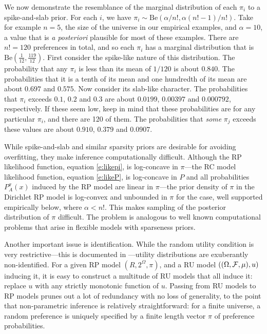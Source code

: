 \documentclass[11pt,letter]{article}
\newcommand{\Dpi}{Dirichlet RP model}
\begin{document}
We now demonstrate the resemblance of the marginal distribution of each $\pi_i$ to a spike-and-slab prior.
For each $i$, we have $\pi_i \sim \mathrm{Be}(\alpha/n!, \alpha (n!-1)/n!)$.
Take for example $n=5$, the size of the universe in our empirical examples, and $\alpha = 10$, a value that is {\em a posteriori} plausible for most of these examples.
There are $n! = 120$ preferences in total, and so each $\pi_i$ has a marginal distribution that is $\mathrm{Be}(\tfrac{1}{12}, \tfrac{119}{12})$.
First consider the spike-like nature of this distribution.
The probability that any $\pi_i$ is less than its mean of $1/120$ is about $0.840$.
The probabilities that it is a tenth of its mean and one hundredth of its mean are about $0.697$ and $0.575$.
Now consider its slab-like character.
The probabilities that $\pi_i$ exceeds $0.1$, $0.2$ and $0.3$ are about $0.0199$, $0.00397$ and $0.000792$, respectively.
If these seem low, keep in mind that these probabilities are for any particular $\pi_i$, and there are 120 of them.
The probabilities that {\em some} $\pi_j$ exceeds these values are about $0.910$, $0.379$ and $0.0907$.

While spike-and-slab and similar sparsity priors are desirable for avoiding overfitting, they make inference computationally difficult.
Although the RP likelihood function, equation \eqref{e:likepi}, is log-concave in $\pi$---the RC model likelihood function, equation \eqref{e:likeP}, is log-concave in $P$ and all probabilities $P^\pi_A(x)$ induced by the RP model are linear in $\pi$---the prior density of $\pi$ in the \Dpi{} is log-convex and unbounded in $\pi$ for the case, well supported empirically below, where $\alpha < n!$.
This makes sampling of the posterior distribution of $\pi$ difficult.
The problem is analogous to well known computational problems that arise in flexible models with sparseness priors.

Another important issue is identification.
While the random utility condition is very restrictive---this is documented in ---utility distributions are exuberantly non-identified.
For a given RP model $(R,2^\Omega,\pi)$, and a RU model $((\Omega, {\cal F}, \mu), u)$ inducing it, it is easy to construct a multitude of RU models that all induce it: replace $u$ with any strictly monotonic function of $u$.
Passing from RU models to RP models prunes out a lot of redundancy with no loss of generality, to the point that non-parametric inference is relatively straightforward: for a finite universe, a random preference is uniquely specified by a finite length vector $\pi$ of preference probabilities.
\end{document}
